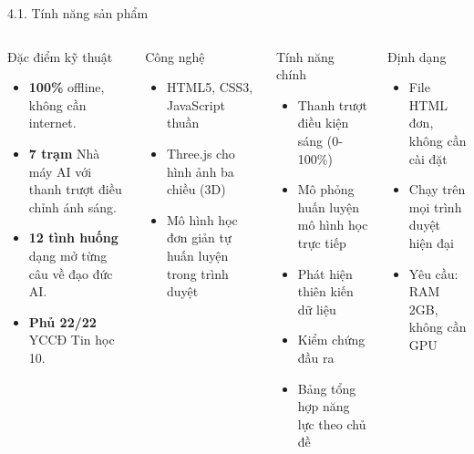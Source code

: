 \documentclass[10pt, aspectratio=169]{beamer}
\begin{document}
\begin{frame}{4.1. Tính năng sản phẩm}
    \begin{columns}
        \begin{block}{Đặc điểm kỹ thuật}
            \begin{itemize}
                \item \textbf{100\%} offline, không cần internet.
                \item \textbf{7 trạm} Nhà máy AI với thanh trượt điều chỉnh ánh sáng.
                \item \textbf{12 tình huống} dạng mở từng câu về đạo đức AI.
                \item \textbf{Phủ 22/22} YCCĐ Tin học 10.
            \end{itemize}
        \end{block}
        
        \begin{block}{Công nghệ}
            \begin{itemize}
                \item HTML5, CSS3, JavaScript thuần
                \item Three.js cho hình ảnh ba chiều (3D)
                \item Mô hình học đơn giản tự huấn luyện trong trình duyệt
            \end{itemize}
        \end{block}
        \begin{block}{Tính năng chính}
            \begin{itemize}
                \item Thanh trượt điều kiện sáng (0-100\%)
                \item Mô phỏng huấn luyện mô hình học trực tiếp
                \item Phát hiện thiên kiến dữ liệu
                \item Kiểm chứng đầu ra
                \item Bảng tổng hợp năng lực theo chủ đề
            \end{itemize}
        \end{block}
        
        \begin{block}{Định dạng}
            \begin{itemize}
                \item File HTML đơn, không cần cài đặt
                \item Chạy trên mọi trình duyệt hiện đại
                \item Yêu cầu: RAM 2GB, không cần GPU
            \end{itemize}
        \end{block}
    \end{columns}
\end{frame}
\end{document}
